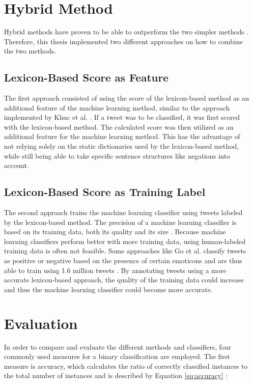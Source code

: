 \section{Hybrid Method}
Hybrid methods have proven to be able to outperform the two simpler methods \cite{khuc}. Therefore, this thesis implemented two different approaches on how to combine the two methods.

\subsection{Lexicon-Based Score as Feature}
The first approach consisted of using the score of the lexicon-based method as an additional feature of the machine learning method, similar to the approach implemented by Khuc et al. \cite{khuc}. If a tweet was to be classified, it was first scored with the lexicon-based method. The calculated score was then utilized as an additional feature for the machine learning method. This has the advantage of not relying solely on the static dictionaries used by the lexicon-based method, while still being able to take specific sentence structures like negations into account.
\subsection{Lexicon-Based Score as Training Label}
The second approach trains the machine learning classifier using tweets labeled by the lexicon-based method. The precision of a machine learning classifier is based on its training data, both its quality and its size \cite{DBLP:journals/csur/GiachanouC16}. Because machine learning classifiers perform better with more training data, using human-labeled training data is often not feasible. Some approaches like Go et al. classify tweets as positive or negative based on the presence of certain emoticons and are thus able to train using 1.6 million tweets \cite{GoBHaHua2009}. By annotating tweets using a more accurate lexicon-based approach, the quality of the training data could increase and thus the machine learning classifier could become more accurate.

\section{Evaluation}
In order to compare and evaluate the different methods and classifiers, four commonly used measures for a binary classification are employed. The first measure is accuracy, which calculates the ratio of correctly classified instances to the total number of instances and is described by Equation \eqref{eq:accuracy} \cite{DBLP:journals/csur/GiachanouC16}:

